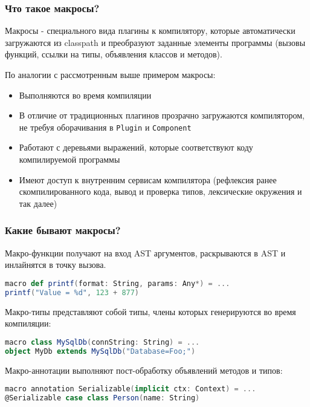 \documentclass[hyperref={bookmarks=false}]{beamer}
\begin{document}
\begin{frame}[t,fragile]
\frametitle{Что такое макросы?}

Макросы - специального вида плагины к компилятору, которые автоматически загружаются из classpath и преобразуют заданные элементы программы (вызовы функций, ссылки на типы, объявления классов и методов).

По аналогии с рассмотренным выше примером макросы:
\begin{itemize}
\item Выполняются во время компиляции
\item В отличие от традиционных плагинов прозрачно загружаются компилятором, не требуя оборачивания в \texttt{Plugin} и \texttt{Component}
\item Работают с деревьями выражений, которые соответствуют коду компилируемой программы
\item Имеют доступ к внутренним сервисам компилятора (рефлексия ранее скомпилированного кода, вывод и проверка типов, лексические окружения и так далее)
\end{itemize}
\end{frame}


\begin{frame}[t,fragile]
\frametitle{Какие бывают макросы?}

Макро-функции получают на вход AST аргументов, раскрываются в AST и инлайнятся в точку вызова.

\begin{lstlisting}[language=scala]
macro def printf(format: String, params: Any*) = ...
printf("Value = %d", 123 + 877)
\end{lstlisting}

Макро-типы представляют собой типы, члены которых генерируются во время компиляции:

\begin{lstlisting}[language=scala]
macro class MySqlDb(connString: String) = ...
object MyDb extends MySqlDb("Database=Foo;")
\end{lstlisting}

Макро-аннотации выполняют пост-обработку объявлений методов и типов:

\begin{lstlisting}[language=scala]
macro annotation Serializable(implicit ctx: Context) = ...
@Serializable case class Person(name: String)
\end{lstlisting}
\end{frame}
\end{document}
